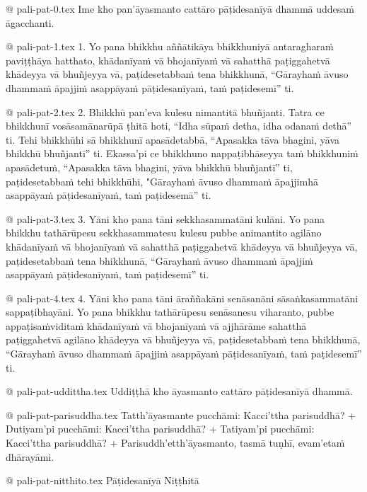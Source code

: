 @ pali-pat-0.tex
Ime kho pan’āyasmanto cattāro pāṭidesanīyā dhammā uddesaṁ āgacchanti.

@ pali-pat-1.tex
1. Yo pana bhikkhu aññātikāya bhikkhuniyā antaragharaṁ paviṭṭhāya hatthato, khādanīyaṁ vā bhojanīyaṁ vā sahatthā paṭiggahetvā khādeyya vā bhuñjeyya vā, paṭidesetabbaṁ tena bhikkhunā, “Gārayhaṁ āvuso dhammaṁ āpajjiṁ asappāyaṁ pāṭidesanīyaṁ, taṁ paṭidesemī” ti.

@ pali-pat-2.tex
2. Bhikkhū pan’eva kulesu nimantitā bhuñjanti. Tatra ce bhikkhunī vosāsamānarūpā ṭhitā hoti, “Idha sūpaṁ detha, idha odanaṁ dethā” ti. Tehi bhikkhūhi sā bhikkhunī apasādetabbā, “Apasakka tāva bhagini, yāva bhikkhū bhuñjantī” ti. Ekassa’pi ce bhikkhuno nappaṭibhāseyya taṁ bhikkhuniṁ apasādetuṁ, “Apasakka tāva bhagini, yāva bhikkhū bhuñjantī” ti, paṭidesetabbaṁ tehi bhikkhūhi, "Gārayhaṁ āvuso dhammaṁ āpajjimhā asappāyaṁ pāṭidesanīyaṁ, taṁ paṭidesemā” ti.

@ pali-pat-3.tex
3. Yāni kho pana tāni sekkhasammatāni kulāni. Yo pana bhikkhu tathārūpesu sekkhasammatesu kulesu pubbe animantito agilāno khādanīyaṁ vā bhojanīyaṁ vā sahatthā paṭiggahetvā khādeyya vā bhuñjeyya vā, paṭidesetabbaṁ tena bhikkhunā, “Gārayhaṁ āvuso dhammaṁ āpajjiṁ asappāyaṁ pāṭidesanīyaṁ, taṁ paṭidesemī” ti.

@ pali-pat-4.tex
4. Yāni kho pana tāni āraññakāni senāsanāni sāsaṅkasammatāni sappaṭibhayāni. Yo pana bhikkhu tathārūpesu senāsanesu viharanto, pubbe appaṭisaṁviditaṁ khādanīyaṁ vā bhojanīyaṁ vā ajjhārāme sahatthā paṭiggahetvā agilāno khādeyya vā bhuñjeyya vā, paṭidesetabbaṁ tena bhikkhunā, “Gārayhaṁ āvuso dhammaṁ āpajjiṁ asappāyaṁ pāṭidesanīyaṁ, taṁ paṭidesemī” ti.

@ pali-pat-uddittha.tex
Uddiṭṭhā kho āyasmanto cattāro pāṭidesanīyā dhammā.

@ pali-pat-parisuddha.tex
Tatth’āyasmante pucchāmi: Kacci’ttha parisuddhā? +
Dutiyam’pi pucchāmi: Kacci’ttha parisuddhā? +
Tatiyam’pi pucchāmi: Kacci’ttha parisuddhā? +
Parisuddh’etth’āyasmanto, tasmā tuṇhī, evam’etaṁ dhārayāmi.

@ pali-pat-nitthito.tex
Pāṭidesanīyā Niṭṭhitā
